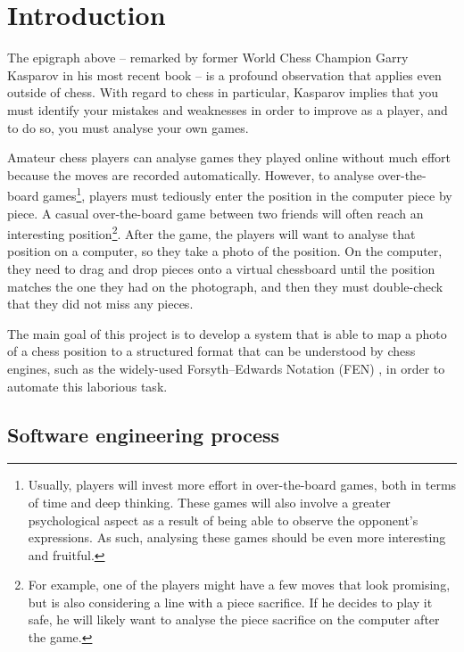 \documentclass[../main.tex]{subfiles}
\begin{document}
\chapter{Introduction}

The epigraph above -- remarked by former World Chess Champion Garry Kasparov in his most recent book \cite{kasparov2018} -- is a profound observation that applies even outside of chess.
With regard to chess in particular, Kasparov implies that you must identify your mistakes and weaknesses in order to improve as a player, and to do so, you must analyse your own games. 

Amateur chess players can analyse games they played online without much effort because the moves are recorded automatically.
However, to analyse over-the-board games\footnote{Usually, players will invest more effort in over-the-board games, both in terms of time and deep thinking. These games will also involve a greater psychological aspect as a result of being able to observe the opponent's expressions. As such, analysing these games should be even more interesting and fruitful.}, players must tediously enter the position in the computer piece by piece.
A casual over-the-board game between two friends will often reach an interesting position\footnote{For example, one of the players might have a few moves that look promising, but is also considering a line with a piece sacrifice. If he decides to play it safe, he will likely want to analyse the piece sacrifice on the computer after the game.}. 
After the game, the players will want to analyse that position on a computer, so they take a photo of the position. 
On the computer, they need to drag and drop pieces onto a virtual chessboard until the position matches the one they had on the photograph, and then they must double-check that they did not miss any pieces.

The main goal of this project is to develop a system that is able to map a photo of a chess position to a structured format that can be understood by chess engines, such as the widely-used Forsyth–Edwards Notation (FEN) \cite{edwards1994}, in order to automate this laborious task.




% 

\section{Software engineering process}
\end{document}
